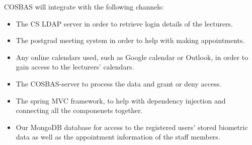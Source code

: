 COSBAS will integrate with the following channels:

\begin{itemize}
	\item The CS LDAP server in order to retrieve login details of the lecturers.
	\item The postgrad meeting system in order to help with making appointments.
	\item Any online calendars used, such as Google calendar or Outlook, in order to gain access to the lecturers' calendars.
	\item The COSBAS-server to process the data and grant or deny access.
	\item The spring MVC framework, to help with dependency injection and connecting all the componenets together.
	\item Our MongoDB database for access to the registered users'  stored biometric data as well as the appointment information of the staff members. 
\end{itemize}